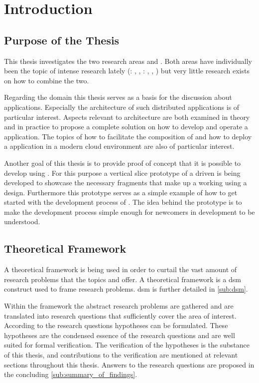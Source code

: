 \chapter{Introduction}

\section{Purpose of the Thesis}

This thesis investigates the two research areas \mss{} and
\ogs{}. Both areas have individually been the topic of intense research lately
(\mss{}: \cite{zimmermann2016microservices}, \cite{di2017research},
\ogs{}: \cite{bosch2017towards}, \cite{smed2017algorithms},
\cite{liu2017apparatus}) but very little research exists on how to combine the
two.

Regarding the \mss{} domain this thesis serves as a basis for the discussion
about \ms{} applications. Especially the architecture of such distributed \ms{}
applications is of particular interest. Aspects relevant to architecture are
both examined in theory and in practice to propose a complete solution on how to
develop and operate a \ms{} application. The topics of how to facilitate the
composition of \mss{} and how to deploy a \ms{} application in a modern cloud
environment are also of particular interest.

Another goal of this thesis is to provide proof of concept that it is possible
to develop \ogs{} using \mss{}. For this purpose a vertical slice prototype of a
\ms{} driven \og{} is being developed to showcase the necessary fragments that
make up a working \og{} using a \ms{} design. Furthermore this prototype serves
as a simple example of how to get started with the development process of
\ogs{}. The idea behind the prototype is to make the development process simple
enough for newcomers in \og{} development to be understood.


\section{Theoretical Framework}
\label{sec:theoretical_framework}

A theoretical framework is being used in order to curtail the vast amount of
research problems that the topics \ogs{} and \mss{} offer. A theoretical
framework is a \gls{dsm} construct used to frame research problems. \gls{dsm} is
further detailed in \autoref{sub:dsm}.

Within the framework the abstract research problems are gathered and are
translated into research questions that sufficiently cover the area of interest.
According to the research questions hypotheses can be formulated. These
hypotheses are the condensed essence of the research questions and are well
suited for formal verification. The verification of the hypotheses is the
substance of this thesis, and contributions to the verification are mentioned at
relevant sections throughout this thesis. Answers to the research questions
are proposed in the concluding \autoref{sub:summary_of_findings}.

